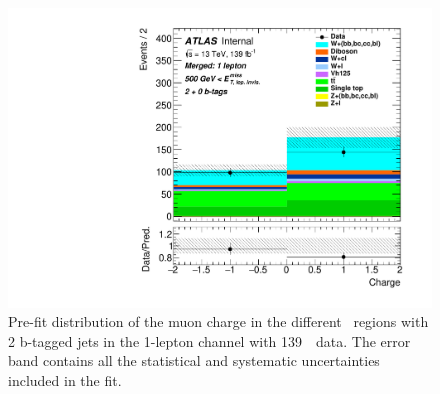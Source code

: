 \begin{figure}[H]
  \includegraphics[width=0.46\linewidth]{chapters/c9/figures/Region_BMin500_incFat1_Fat1_incJet1_Y2015_DCR1_T20_L1_distCharge_J0_Prefit.pdf}
\caption{Pre-fit distribution of the muon charge in the different \met~regions with \\2 b-tagged jets in the 1-lepton channel with 139~\ifb~data. The error band contains all the statistical and 
    systematic uncertainties included in the fit.}
\label{fig:Data_MC_CR1_mu_charge_2b}
\end{figure}
